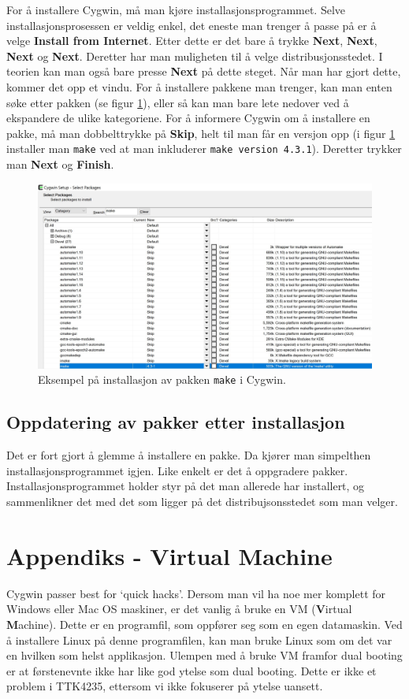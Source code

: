 For å installere Cygwin, må man kjøre installasjonsprogrammet. Selve installasjonsprosessen er veldig enkel, det eneste man trenger å passe på er å velge \textbf{Install from Internet}. Etter dette er det bare å trykke \textbf{Next}, \textbf{Next}, \textbf{Next} og \textbf{Next}. Deretter har man muligheten til å velge distribusjonsstedet. I teorien kan man også bare presse \textbf{Next} på dette steget. Når man har gjort dette, kommer det opp et vindu. For å installere pakkene man trenger, kan man enten søke etter pakken (se figur \ref{fig:Cygwin-setup}), eller så kan man bare lete nedover ved å ekspandere de ulike kategoriene. For å informere Cygwin om å installere en pakke, må man dobbelttrykke på \textbf{Skip}, helt til man får en versjon opp (i figur \ref{fig:Cygwin-setup} installer man \verb|make| ved at man inkluderer \verb|make version 4.3.1|). Deretter trykker man \textbf{Next} og \textbf{Finish}.

\begin{figure}[ht]
    \centering
    \includegraphics[scale=0.53]{Main/figures/Capture.JPG}
    \caption{Eksempel på installasjon av pakken \texttt{make} i Cygwin.}
    \label{fig:Cygwin-setup}
\end{figure}

\subsection{Oppdatering av pakker etter installasjon}

Det er fort gjort å glemme å installere en pakke. Da kjører man simpelthen installasjonsprogrammet igjen. Like enkelt er det å oppgradere pakker. Installasjonsprogrammet holder styr på det man allerede har installert, og sammenlikner det med det som ligger på det distribujsonsstedet som man velger.

\section{Appendiks - Virtual Machine}\label{app:VM}
Cygwin passer best for `quick hacks'. Dersom man vil ha noe mer komplett for Windows eller Mac OS maskiner, er det vanlig å bruke en VM (\textbf{V}irtual \textbf{M}achine). Dette er en programfil, som oppfører seg som en egen datamaskin. Ved å installere Linux på denne programfilen, kan man bruke Linux som om det var en hvilken som helst applikasjon. Ulempen med å bruke VM framfor dual booting er at førstenevnte ikke har like god ytelse som dual booting. Dette er ikke et problem i TTK4235, ettersom vi ikke fokuserer på ytelse uansett.

